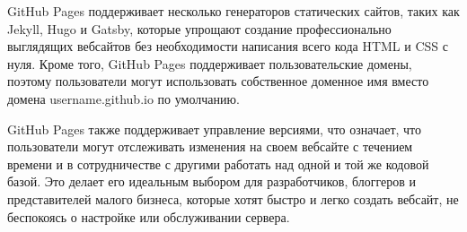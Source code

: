 \documentclass[letterpaper,10pt,russian]{sphinxmanual}
\begin{document}
\sphinxAtStartPar
GitHub Pages поддерживает несколько генераторов статических сайтов, таких как Jekyll, Hugo и Gatsby, которые упрощают создание профессионально выглядящих веб\sphinxhyphen{}сайтов без необходимости написания всего кода HTML и CSS с нуля. Кроме того, GitHub Pages поддерживает пользовательские домены, поэтому пользователи могут использовать собственное доменное имя вместо домена username.github.io по умолчанию.

\sphinxAtStartPar
GitHub Pages также поддерживает управление версиями, что означает, что пользователи могут отслеживать изменения на своем веб\sphinxhyphen{}сайте с течением времени и в сотрудничестве с другими работать над одной и той же кодовой базой. Это делает его идеальным выбором для разработчиков, блоггеров и представителей малого бизнеса, которые хотят быстро и легко создать веб\sphinxhyphen{}сайт, не беспокоясь о настройке или обслуживании сервера.
\end{document}

